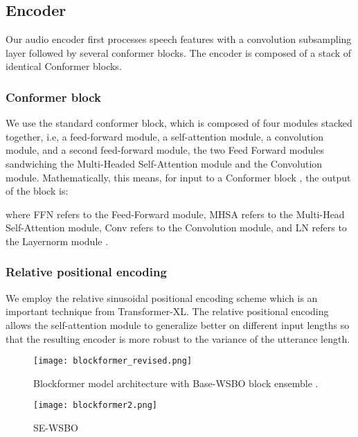 \documentclass[a4paper]{article}
\begin{document}
\subsection{Encoder}
Our audio encoder first processes speech features with a convolution
subsampling layer followed by several conformer blocks. The encoder is composed of a stack of identical Conformer blocks.
\subsubsection{Conformer block}

We use the standard conformer block\cite{gulati2020conformer}, which is composed of four modules stacked together, i.e, a feed-forward module, a self-attention module, a convolution module, and a second feed-forward module, the two Feed Forward modules sandwiching the Multi-Headed Self-Attention module and the Convolution module. Mathematically, this means, for input 
to a Conformer block , the output  of the block is:




where FFN refers to the Feed-Forward module, MHSA refers to the Multi-Head Self-Attention module, Conv refers to the
Convolution module, and LN refers to the Layernorm module .


\subsubsection{Relative positional encoding}
We employ the relative sinusoidal positional encoding scheme which is an important technique from Transformer-XL\cite{Dai2019TransformerXLAL}. The relative positional encoding allows the self-attention module to generalize better on different input lengths so that the resulting encoder is more robust to the variance of the utterance length.

\begin{figure}[t]
  \centering
  \texttt{[image: blockformer\_revised.png]}
  \caption{Blockformer model architecture with Base-WSBO block ensemble .}
  \label{fig:speech_production}
\end{figure}

\begin{figure}[t]
  \centering
  \texttt{[image: blockformer2.png]}
  \caption{SE-WSBO}
  \label{fig:speech_production}
\end{figure}
\end{document}
